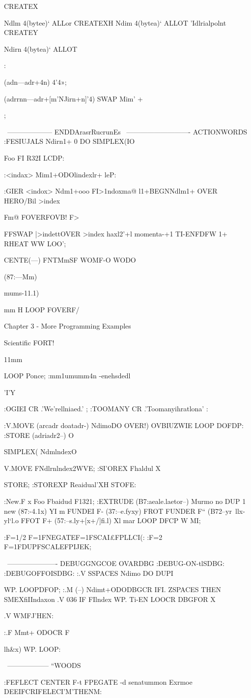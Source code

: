 {{{{{{{{{{{{CREATEX{ Ndlm 4(bytee)‘ ALLor \trialpoint
CREATEXH Ndim 4(bytea)‘ ALLOT \Z'Idlrialpolnt
CREATEY{ Ndirn 4(bytea)‘ ALLOT \geocenter

:} (adn—adr+4n) 4'4»; }} (adrrnn—adr+[m'NJirn+n]'4) SWAP Mim' + };

\ -------------------- ENDDArasrRucrunEs
\ ---------------------------- ACTIONWORDS
:FESIUJALS
Ndirn1+ 0 DO SIMPLEX{(IO}} Foo F{I} R32I
LCDP:

:<indax> Mim1+ODOlindexlr+ leP: 

:GIER <indox>
Ndm1+ooo F{I>1ndox}ma@
l1+BEGNNdlm1+ OVER
HERO/Bil >index}Fm@ FOVERFOVB! F>

FFSWAP
|>indettOVER >index
haxl2'+l momenta-+1
TI-ENFDFW 1+
RHEAT WW
LOO’;

CENTE(—) FNTMmSF
WOMF-O
WODO

(87:—Mm)
\Ioepwereomponents
\uraoeoverm

mums-11.1)} mm H
LOOP FOVERF/

Chapter 3 - More Programming Examples

 

Scientiﬁc FORT!

11mm

LOOP Ponce;
\m:mm1umumm4n
\--enehsdedl

\WII'I'Y

:OGIEI CR .'We'rellniaed.' ;
:TOOMANY CR .'Toomanyihratlona' :

:V.MOVE (arcadr doatadr-) \rnovevemr
NdimoDO OVER!) OVBIUZWIE
LOOP DOFDP:
:STORE (adriadr2--) O}
SIMPLEX({ NdmlndexO}}V.MOVE
F{Ndlrnlndex}2WVE;
:SI'OREX Fhaldul X{ STORE;
:STOREXP Reaidual'XH STOFE:

:New.F x{ Foo Fbaidud F1321;
:EXTRUDE (B7:aeale.laetor--)
\exbndpaeudopod
Murmo no DUP 1} new (87:-4.1x)
Y{I} m FUNDEI F- (37:--e.fyxy)
FROT FUNDER F“ (B72--yr~llx-yl‘l.o
FFOT F+ (57:--s.ly+[x+/]fi.l)
X{l} mar
LOOP DFCP W MI;

:F=1/2 F=1FNEGATEF=1FSCAI£FPLLCI(:
:F=2 F=1FDUPFSCALEFPIJEK;

\ ---------------------- DEBUGGNGCOE
OVARDBG
:DEBUG-ON-tlSDBG:
:DEBUGOFFOISDBG:
:.V SSPACES Ndimo DO DUPI} WP.
LOOPDFOP;
:.M (--)
Ndimt+ODODBGCR
IFI. ZSPACES THEN
SMEXﬁIIndaxon .V
036 IF F{Ilndex} WP. Ti-EN
LOOCR
DBGFOR X{.V WMFJ'HEN:

:.F Mmt+ ODOCR F{lh&x) WP.
LOOP:

\ ------------------ “WOODS

:FEFLECT CENTER
F-t FPEGATE \nblaebr-d
senatummon \mn
Exrmoe \ealeulabeM
DEEIFCRIFELECI’M'THENM:

}}}}}}}
